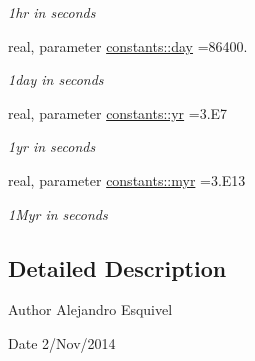 \begin{DoxyCompactItemize}
\begin{DoxyCompactList}\small\item\em 1hr in seconds \end{DoxyCompactList}\item 
\hypertarget{namespaceconstants_a9578082af66e4af5e4101e39b4abde29}{}real, parameter \hyperlink{namespaceconstants_a9578082af66e4af5e4101e39b4abde29}{constants\+::day} =86400.\label{namespaceconstants_a9578082af66e4af5e4101e39b4abde29}

\begin{DoxyCompactList}\small\item\em 1day in seconds \end{DoxyCompactList}\item 
\hypertarget{namespaceconstants_a1fd58880de7afc0479eb60d136bac8b2}{}real, parameter \hyperlink{namespaceconstants_a1fd58880de7afc0479eb60d136bac8b2}{constants\+::yr} =3.\+E7\label{namespaceconstants_a1fd58880de7afc0479eb60d136bac8b2}

\begin{DoxyCompactList}\small\item\em 1yr in seconds \end{DoxyCompactList}\item 
\hypertarget{namespaceconstants_af554c9cfbc1f3c74a8176265ea5370dd}{}real, parameter \hyperlink{namespaceconstants_af554c9cfbc1f3c74a8176265ea5370dd}{constants\+::myr} =3.\+E13\label{namespaceconstants_af554c9cfbc1f3c74a8176265ea5370dd}

\begin{DoxyCompactList}\small\item\em 1\+Myr in seconds \end{DoxyCompactList}\end{DoxyCompactItemize}


\subsection{Detailed Description}
\begin{DoxyAuthor}{Author}
Alejandro Esquivel 
\end{DoxyAuthor}
\begin{DoxyDate}{Date}
2/\+Nov/2014 
\end{DoxyDate}
